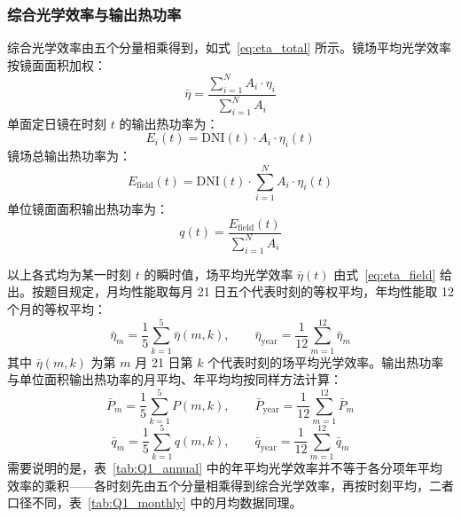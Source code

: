 \documentclass[12pt,a4paper,fontset=fandol]{ctexart}
\begin{document}
\subsubsection{综合光学效率与输出热功率}

综合光学效率由五个分量相乘得到，如式~\eqref{eq:eta_total} 所示。镜场平均光学效率按镜面面积加权：
\begin{equation}
    \bar{\eta} = \frac{\sum_{i=1}^{N} A_i \cdot \eta_i}{\sum_{i=1}^{N} A_i}
    \label{eq:eta_field}
\end{equation}
单面定日镜在时刻 $t$ 的输出热功率为：
\begin{equation}
    E_i(t) = \mathrm{DNI}(t) \cdot A_i \cdot \eta_i(t)
    \label{eq:E_i}
\end{equation}
镜场总输出热功率为：
\begin{equation}
    E_{\mathrm{field}}(t) = \mathrm{DNI}(t) \cdot \sum_{i=1}^{N} A_i \cdot \eta_i(t)
    \label{eq:E_field}
\end{equation}
单位镜面面积输出热功率为：
\begin{equation}
    q(t) = \frac{E_{\mathrm{field}}(t)}{\sum_{i=1}^{N} A_i}
    \label{eq:q}
\end{equation}

以上各式均为某一时刻 $t$ 的瞬时值，场平均光学效率 $\bar{\eta}(t)$ 由式~\eqref{eq:eta_field} 给出。按题目规定，月均性能取每月 21 日五个代表时刻的等权平均，年均性能取 12 个月的等权平均：
\begin{equation}
    \bar{\eta}_m = \frac{1}{5}\sum_{k=1}^{5}\bar{\eta}(m, k), \qquad
    \bar{\eta}_{\mathrm{year}} = \frac{1}{12}\sum_{m=1}^{12}\bar{\eta}_m
    \label{eq:avg_month_year}
\end{equation}
其中 $\bar{\eta}(m,k)$ 为第 $m$ 月 21 日第 $k$ 个代表时刻的场平均光学效率。输出热功率与单位面积输出热功率的月平均、年平均均按同样方法计算：
\begin{equation}
    \bar{P}_m = \frac{1}{5}\sum_{k=1}^{5}P(m,k), \qquad
    \bar{P}_{\mathrm{year}} = \frac{1}{12}\sum_{m=1}^{12}\bar{P}_m
    \label{eq:avg_power}
\end{equation}
\begin{equation}
    \bar{q}_m = \frac{1}{5}\sum_{k=1}^{5}q(m,k), \qquad
    \bar{q}_{\mathrm{year}} = \frac{1}{12}\sum_{m=1}^{12}\bar{q}_m
    \label{eq:avg_q}
\end{equation}
需要说明的是，表~\ref{tab:Q1_annual} 中的年平均光学效率并不等于各分项年平均效率的乘积——各时刻先由五个分量相乘得到综合光学效率，再按时刻平均，二者口径不同，表~\ref{tab:Q1_monthly} 中的月均数据同理。
\end{document}
